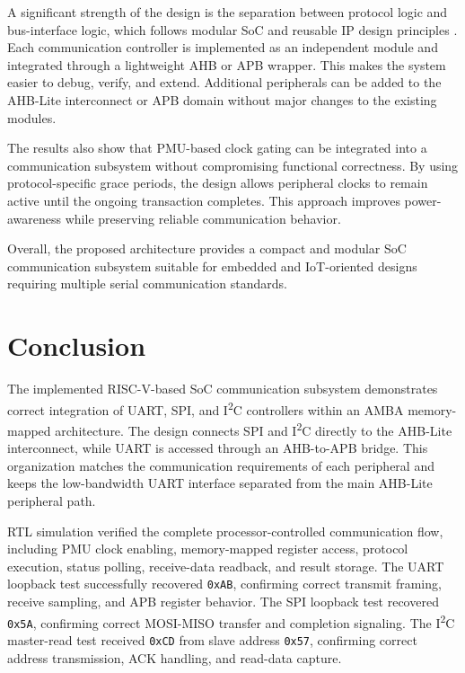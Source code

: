 \documentclass[runningheads]{llncs}
\begin{document}
A significant strength of the design is the separation between protocol logic and bus-interface logic, which follows modular SoC and reusable IP design principles \cite{wolf2012,furber2000,amba3ahb,amba3apb}. Each communication controller is implemented as an independent module and integrated through a lightweight AHB or APB wrapper. This makes the system easier to debug, verify, and extend. Additional peripherals can be added to the AHB-Lite interconnect or APB domain without major changes to the existing modules.

The results also show that PMU-based clock gating can be integrated into a communication subsystem without compromising functional correctness. By using protocol-specific grace periods, the design allows peripheral clocks to remain active until the ongoing transaction completes. This approach improves power-awareness while preserving reliable communication behavior.

Overall, the proposed architecture provides a compact and modular SoC communication subsystem suitable for embedded and IoT-oriented designs requiring multiple serial communication standards.

\section{Conclusion}
\label{sec:conclusion}

The implemented RISC-V-based SoC communication subsystem demonstrates correct integration of UART, SPI, and I\textsuperscript{2}C controllers within an AMBA memory-mapped architecture. The design connects SPI and I\textsuperscript{2}C directly to the AHB-Lite interconnect, while UART is accessed through an AHB-to-APB bridge. This organization matches the communication requirements of each peripheral and keeps the low-bandwidth UART interface separated from the main AHB-Lite peripheral path.

RTL simulation verified the complete processor-controlled communication flow, including PMU clock enabling, memory-mapped register access, protocol execution, status polling, receive-data readback, and result storage. The UART loopback test successfully recovered \texttt{0xAB}, confirming correct transmit framing, receive sampling, and APB register behavior. The SPI loopback test recovered \texttt{0x5A}, confirming correct MOSI-MISO transfer and completion signaling. The I\textsuperscript{2}C master-read test received \texttt{0xCD} from slave address \texttt{0x57}, confirming correct address transmission, ACK handling, and read-data capture.
\end{document}
